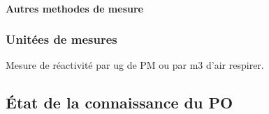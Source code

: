 \paragraph{Autres methodes de mesure}%
\label{sub:autres_methodes_de_mesure}

\subsubsection{Unitées de mesures}%
\label{ssub:unitees_de_mesures}

Mesure de réactivité par ug de PM ou par m3 d'air respirer.

\subsection{État de la connaissance du PO}%
\label{sub:etat_de_la_connaissance_du_po}



\printbibliography[segment=2,heading=subbibliography]
